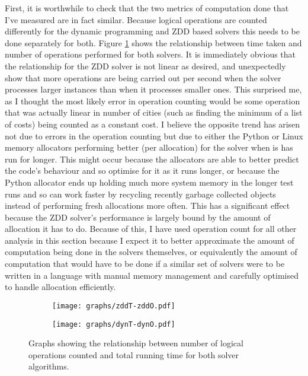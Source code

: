 \documentclass[12pt,a4paper,twoside,openright]{report}
\begin{document}
First, it is worthwhile to check that the two metrics of computation done that I've measured are in fact similar. Because logical operations are counted differently for the dynamic programming and ZDD based solvers this needs to be done separately for both. Figure \ref{timeoperations} shows the relationship between time taken and number of operations performed for both solvers. It is immediately obvious that the relationship for the ZDD solver is not linear as desired, and unexpectedly show that more operations are being carried out per second when the solver processes larger instances than when it processes smaller ones. This surprised me, as I thought the most likely error in operation counting would be some operation that was actually linear in number of cities (such as finding the minimum of a list of costs) being counted as a constant cost. I believe the opposite trend has arisen not due to errors in the operation counting but due to either the Python or Linux memory allocators performing better (per allocation) for the solver when is has run for longer. This might occur because the allocators are able to better predict the code's behaviour and so optimise for it as it runs longer, or because the Python allocator ends up holding much more system memory in the longer test runs and so can work faster by recycling recently garbage collected objects instead of performing fresh allocations more often. This has a significant effect because the ZDD solver's performance is largely bound by the amount of allocation it has to do. Because of this, I have used operation count for all other analysis in this section because I expect it to better approximate the amount of computation being done in the solvers themselves, or equivalently the amount of computation that would have to be done if a similar set of solvers were to be written in a language with manual memory management and carefully optimised to handle allocation efficiently.

\begin{figure}[tbh]
\centering

\begin{subfigure}[b]{0.8\textwidth}
\centering
\texttt{[image: graphs/zddT-zddO.pdf]}
\caption{}
\end{subfigure}
\begin{subfigure}[b]{0.8\textwidth}
\centering
\texttt{[image: graphs/dynT-dynO.pdf]}
\caption{}
\end{subfigure}

\caption{Graphs showing the relationship between number of logical operations counted and total running time for both solver algorithms.}
\label{timeoperations}
\end{figure}
\end{document}
